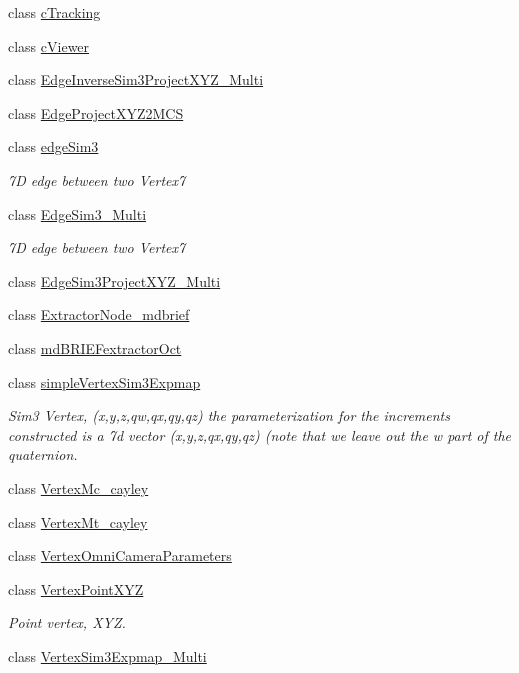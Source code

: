 \begin{DoxyCompactItemize}
\item 
class \hyperlink{classMultiColSLAM_1_1cTracking}{c\+Tracking}
\item 
class \hyperlink{classMultiColSLAM_1_1cViewer}{c\+Viewer}
\item 
class \hyperlink{classMultiColSLAM_1_1EdgeInverseSim3ProjectXYZ__Multi}{Edge\+Inverse\+Sim3\+Project\+X\+Y\+Z\+\_\+\+Multi}
\item 
class \hyperlink{classMultiColSLAM_1_1EdgeProjectXYZ2MCS}{Edge\+Project\+X\+Y\+Z2\+M\+CS}
\item 
class \hyperlink{classMultiColSLAM_1_1edgeSim3}{edge\+Sim3}
\begin{DoxyCompactList}\small\item\em 7D edge between two Vertex7 \end{DoxyCompactList}\item 
class \hyperlink{classMultiColSLAM_1_1EdgeSim3__Multi}{Edge\+Sim3\+\_\+\+Multi}
\begin{DoxyCompactList}\small\item\em 7D edge between two Vertex7 \end{DoxyCompactList}\item 
class \hyperlink{classMultiColSLAM_1_1EdgeSim3ProjectXYZ__Multi}{Edge\+Sim3\+Project\+X\+Y\+Z\+\_\+\+Multi}
\item 
class \hyperlink{classMultiColSLAM_1_1ExtractorNode__mdbrief}{Extractor\+Node\+\_\+mdbrief}
\item 
class \hyperlink{classMultiColSLAM_1_1mdBRIEFextractorOct}{md\+B\+R\+I\+E\+Fextractor\+Oct}
\item 
class \hyperlink{classMultiColSLAM_1_1simpleVertexSim3Expmap}{simple\+Vertex\+Sim3\+Expmap}
\begin{DoxyCompactList}\small\item\em Sim3 Vertex, (x,y,z,qw,qx,qy,qz) the parameterization for the increments constructed is a 7d vector (x,y,z,qx,qy,qz) (note that we leave out the w part of the quaternion. \end{DoxyCompactList}\item 
class \hyperlink{classMultiColSLAM_1_1VertexMc__cayley}{Vertex\+Mc\+\_\+cayley}
\item 
class \hyperlink{classMultiColSLAM_1_1VertexMt__cayley}{Vertex\+Mt\+\_\+cayley}
\item 
class \hyperlink{classMultiColSLAM_1_1VertexOmniCameraParameters}{Vertex\+Omni\+Camera\+Parameters}
\item 
class \hyperlink{classMultiColSLAM_1_1VertexPointXYZ}{Vertex\+Point\+X\+YZ}
\begin{DoxyCompactList}\small\item\em Point vertex, X\+YZ. \end{DoxyCompactList}\item 
class \hyperlink{classMultiColSLAM_1_1VertexSim3Expmap__Multi}{Vertex\+Sim3\+Expmap\+\_\+\+Multi}
\end{DoxyCompactItemize}
